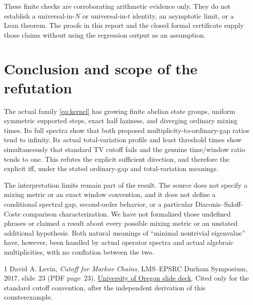 \documentclass[11pt,a4paper]{article}
\theoremstyle{definition}
\theoremstyle{remark}
\begin{document}
These finite checks are corroborating arithmetic evidence only. They do
not establish a universal-in-$N$ or universal-in-$t$ identity, an asymptotic
limit, or a Lean theorem. The proofs in this report and the closed formal
certificate supply those claims without using the regression output as
an assumption.

\section{Conclusion and scope of the refutation}

The actual family \eqref{eq:kernel} has growing finite abelian state groups,
uniform symmetric supported steps, exact half laziness, and diverging
ordinary mixing times. Its full spectra show that both proposed
multiplicity-to-ordinary-gap ratios tend to infinity. Its actual
total-variation profile and least threshold times show simultaneously that
standard TV cutoff fails and the genuine time/window ratio tends to one.
This refutes the explicit sufficient direction, and therefore the explicit
iff, under the stated ordinary-gap and total-variation meanings.

The interpretation limits remain part of the result. The source does not
specify a mixing metric or an exact window convention, and it does not
define a conditional spectral gap, second-order behavior, or a particular
Diaconis--Saloff-Coste comparison characterization. We have not formalized
those undefined phrases or claimed a result about every possible mixing
metric or an unstated additional hypothesis. Both natural meanings of
``minimal nontrivial eigenvalue'' have, however, been handled by actual
operator spectra and actual algebraic multiplicities, with no conflation
between the two.

\begin{thebibliography}{1}
David A. Levin, \emph{Cutoff for Markov Chains}, LMS--EPSRC Durham Symposium,
2017, slide~23 (PDF page~23).
\href{https://pages.uoregon.edu/dlevin/TALKS/durham.pdf}{University of Oregon slide deck}.
Cited only for the standard cutoff convention, after the independent
derivation of this counterexample.
\end{thebibliography}
\end{document}
